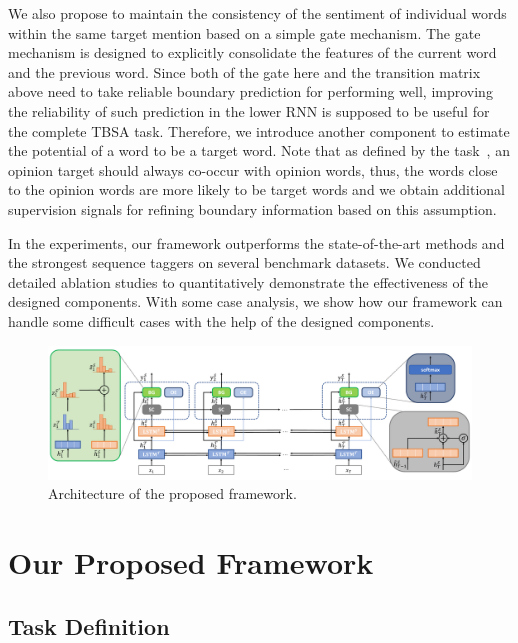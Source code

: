\documentclass[letterpaper]{article} %
\begin{document}
We also propose to maintain the consistency of the sentiment of individual words within the same target mention based on a simple gate mechanism. The gate mechanism is designed to explicitly consolidate the features of the current word and the previous word. Since both of the gate here and the transition matrix above need to take reliable boundary prediction for performing well, improving the reliability of such prediction in the lower RNN is supposed to be useful for the complete TBSA task. Therefore, we introduce another component to estimate the potential of a word to be a target word.
Note that as defined by the task~\cite{S14-2004,S15-2082,S16-1002}, an opinion target should always co-occur with opinion words, thus, the words close to the opinion words are more likely to be target words and we obtain additional supervision signals for refining boundary information based on this assumption.

In the experiments, our framework outperforms the state-of-the-art methods and the strongest sequence taggers on several benchmark datasets. We conducted detailed ablation studies to quantitatively demonstrate the effectiveness of the designed components. With some case analysis, we show how our framework can handle some difficult cases with the help of the designed components.

\begin{figure}
    \centering
    \includegraphics[width=1\textwidth]{architecture_v8.pdf}
    \caption{Architecture of the proposed framework.}
    \label{fig:architecture}
\end{figure}


\section{Our Proposed Framework}
\subsection{Task Definition}
\end{document}
